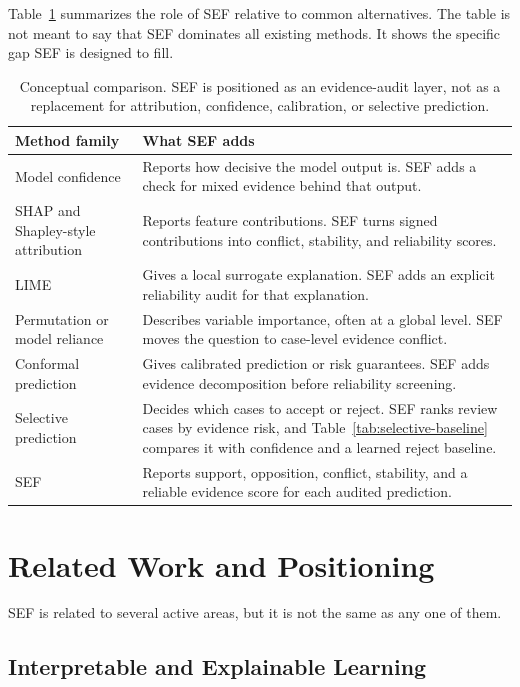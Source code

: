 \documentclass[11pt]{article}
\begin{document}
Table~\ref{tab:method-comparison} summarizes the role of SEF relative to common alternatives. The table is not meant to say that SEF dominates all existing methods. It shows the specific gap SEF is designed to fill.

\begin{table}[!htbp]
\centering
\caption{Conceptual comparison. SEF is positioned as an evidence-audit layer, not as a replacement for attribution, confidence, calibration, or selective prediction.}
\label{tab:method-comparison}
\small
\begin{tabular}{p{}p{}}
\toprule
Method family & What SEF adds \\
\midrule
Model confidence & Reports how decisive the model output is. SEF adds a check for mixed evidence behind that output. \\
SHAP and Shapley-style attribution & Reports feature contributions. SEF turns signed contributions into conflict, stability, and reliability scores. \\
LIME & Gives a local surrogate explanation. SEF adds an explicit reliability audit for that explanation. \\
Permutation or model reliance & Describes variable importance, often at a global level. SEF moves the question to case-level evidence conflict. \\
Conformal prediction & Gives calibrated prediction or risk guarantees. SEF adds evidence decomposition before reliability screening. \\
Selective prediction & Decides which cases to accept or reject. SEF ranks review cases by evidence risk, and Table~\ref{tab:selective-baseline} compares it with confidence and a learned reject baseline. \\
SEF & Reports support, opposition, conflict, stability, and a reliable evidence score for each audited prediction. \\
\bottomrule
\end{tabular}
\end{table}

\FloatBarrier

\section{Related Work and Positioning}

SEF is related to several active areas, but it is not the same as any one of them.

\subsection{Interpretable and Explainable Learning}
\end{document}
